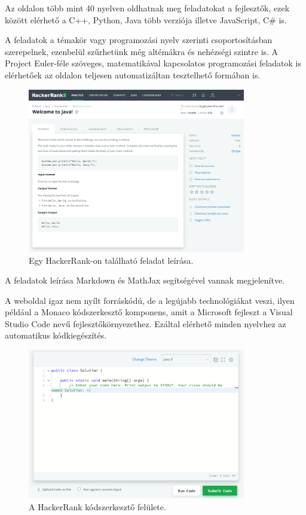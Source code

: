 Az oldalon több mint 40 nyelven oldhatnak meg feladatokat a fejlesztők, ezek között elérhető a C++, Python, Java több verziója illetve JavaScript, C\# is. \cite{hackerrank_environment}

A feladatok a témakör vagy programozási nyelv szerinti csoportosításban szerepelnek, ezenbelül szűrhetünk még altémákra és nehézségi szintre is. A Project Euler-féle szöveges, matematikával kapcsolatos programozási feladatok is elérhetőek az oldalon teljesen automatizáltan tesztelhető formában is.

\begin{figure}[h]
    \centering
    \includegraphics[width=0.85\textwidth]{images/hackerrank_task.png}
    \caption{Egy HackerRank-on található feladat leírása.}
    \label{fig:exercism_task}
\end{figure}

A feladatok leírása Markdown és MathJax segítségével vannak megjelenítve.

A weboldal igaz nem nyílt forráskódú, de a legújabb technológiákat veszi, ilyen például a Monaco kódszerkesztő komponens, amit a Microsoft fejleszt a Visual Studio Code nevű fejlesztőkörnyezethez. Ezáltal elérhető minden nyelvhez az automatikus kódkiegészítés.

\begin{figure}[h]
    \centering
    \includegraphics[width=0.85\textwidth]{images/hackerrank_editor.png}
    \caption{A HackerRank kódszerkesztő felülete.}
    \label{fig:hackerrank_editor}
\end{figure}

